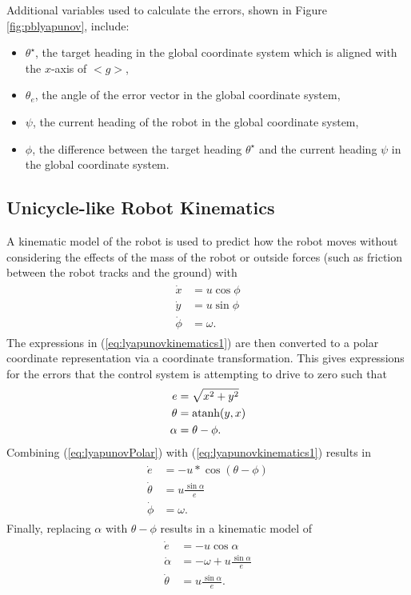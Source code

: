 Additional variables used to calculate the errors, shown in Figure \ref{fig:pblyapunov}, include:
\begin{itemize}
\item $\theta^\star$, the target heading in the global coordinate system which is aligned with the $x$-axis of $<g>$,
\item $\theta_e$, the angle of the error vector in the global coordinate system,
\item $\psi$, the current heading of the robot in the global coordinate system,
\item $\phi$, the difference between the target heading $\theta^\star$ and the current heading $\psi$ in the global coordinate system.
\end{itemize}

\subsection{Unicycle-like Robot Kinematics}
\label{sec:unicycleKinematics}
A kinematic model of the robot is used to predict how the robot moves without considering the effects of the mass of the robot or outside forces (such as friction between the robot tracks and the ground) with
\begin{align}
\label{eq:lyapunovkinematics1}
\begin{split}
\dot{x} &= u\cos\phi \\
\dot{y} &= u\sin\phi \\
\dot{\phi} &= \omega.
\end{split}
\end{align}
The expressions in (\ref{eq:lyapunovkinematics1}) are then converted to a polar coordinate representation via a coordinate transformation. This gives expressions for the errors that the control system is attempting to drive to zero such that
\begin{align}
\label{eq:lyapunovPolar}
\begin{split}
e &= \sqrt{x^2+y^2} \\
\theta &= \mathop{\text{atanh}}(y,x) \\
\alpha &= \theta - \phi.
\end{split}
\end{align}
Combining (\ref{eq:lyapunovPolar}) with (\ref{eq:lyapunovkinematics1}) results in
\begin{align*}
\begin{split}
\dot{e} &= -u*\cos(\theta-\phi) \\
\dot{\theta} &= u\frac{\sin\alpha}{e} \\
\dot{\phi} &= \omega.
\end{split}
\end{align*}
Finally, replacing $\alpha$ with $\theta-\phi$ results in a kinematic model of
\begin{align}
\label{eq:lyapunovkinematics}
\begin{split}
\dot{e} &= -u\cos\alpha \\
\dot{\alpha} &= -\omega + u\frac{\sin\alpha}{e} \\
\dot{\theta} &= u\frac{\sin\alpha}{e}.
\end{split}
\end{align}

